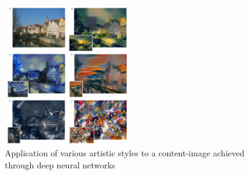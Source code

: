 \begin{figure}
\centering
\includegraphics[width=0.5\textwidth]{img/nn_art_styles.png}
\caption[]{\label{fig:nn_art_styles} Application of various artistic styles to a content-image achieved through deep neural networks \cite{Gatys2015AStyle}} 
\end{figure}